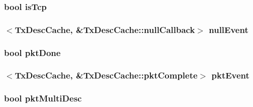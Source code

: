 \label{classIGbE_1_1TxDescCache_ae7a8388f5aa169f8c86c19f91c3b128d}
\hypertarget{classIGbE_1_1TxDescCache_ad610366c4a18d924d4962433c0b8515e}{
\subsubsection[{isTcp}]{\setlength{\rightskip}{0pt plus 5cm}bool {\bf isTcp}}}
\label{classIGbE_1_1TxDescCache_ad610366c4a18d924d4962433c0b8515e}
\hypertarget{classIGbE_1_1TxDescCache_adc0e7fe81737dc40daddf8391bffae79}{
\subsubsection[{nullEvent}]{$<${\bf TxDescCache}, \&TxDescCache::nullCallback$>$ {\bf nullEvent}}}
\label{classIGbE_1_1TxDescCache_adc0e7fe81737dc40daddf8391bffae79}
\hypertarget{classIGbE_1_1TxDescCache_a0807bda2e863c4492ab0165135bf396c}{
\subsubsection[{pktDone}]{\setlength{\rightskip}{0pt plus 5cm}bool {\bf pktDone}}}
\label{classIGbE_1_1TxDescCache_a0807bda2e863c4492ab0165135bf396c}
\hypertarget{classIGbE_1_1TxDescCache_a2a06f4aa962fc09e9e764d3e9006d11b}{
\subsubsection[{pktEvent}]{$<${\bf TxDescCache}, \&TxDescCache::pktComplete$>$ {\bf pktEvent}}}
\label{classIGbE_1_1TxDescCache_a2a06f4aa962fc09e9e764d3e9006d11b}
\hypertarget{classIGbE_1_1TxDescCache_adb0830579bf508fe91ec42f51928ca5d}{
\subsubsection[{pktMultiDesc}]{\setlength{\rightskip}{0pt plus 5cm}bool {\bf pktMultiDesc}}}
